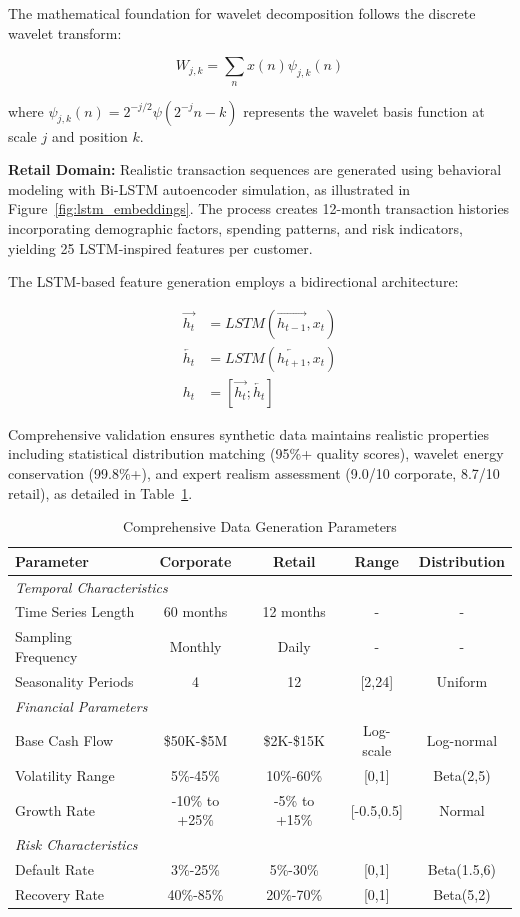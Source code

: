 \documentclass[a4 paper, 11pt,twoside]{article}
\newcommand{\0}{\Bf{0}}
\theoremstyle{definition}
\begin{document}
The mathematical foundation for wavelet decomposition follows the discrete wavelet transform:

\begin{equation}
W_{j,k} = \sum_{n} x(n) \psi_{j,k}(n)
\end{equation}

where $\psi_{j,k}(n) = 2^{-j/2} \psi(2^{-j}n - k)$ represents the wavelet basis function at scale $j$ and position $k$.

\textbf{Retail Domain:} Realistic transaction sequences are generated using behavioral modeling with Bi-LSTM autoencoder simulation, as illustrated in Figure~\ref{fig:lstm_embeddings}. The process creates 12-month transaction histories incorporating demographic factors, spending patterns, and risk indicators, yielding 25 LSTM-inspired features per customer.

The LSTM-based feature generation employs a bidirectional architecture:

\begin{align}
\overrightarrow{h_t} &= LSTM(\overrightarrow{h_{t-1}}, x_t) \\
\overleftarrow{h_t} &= LSTM(\overleftarrow{h_{t+1}}, x_t) \\
h_t &= [\overrightarrow{h_t}; \overleftarrow{h_t}]
\end{align}

Comprehensive validation ensures synthetic data maintains realistic properties including statistical distribution matching (95\%+ quality scores), wavelet energy conservation (99.8\%+), and expert realism assessment (9.0/10 corporate, 8.7/10 retail), as detailed in Table~\ref{tab:data_generation_params}.

\begin{table}
\centering
\caption{Comprehensive Data Generation Parameters}
\label{tab:data_generation_params}
\begin{tabular}{lcccc}
\toprule
\textbf{Parameter} & \textbf{Corporate} & \textbf{Retail} & \textbf{Range} & \textbf{Distribution} \\
\midrule
\multicolumn{5}{l}{\textit{Temporal Characteristics}} \\
Time Series Length & 60 months & 12 months & - & - \\
Sampling Frequency & Monthly & Daily & - & - \\
Seasonality Periods & 4 & 12 & [2,24] & Uniform \\
\midrule
\multicolumn{5}{l}{\textit{Financial Parameters}} \\
Base Cash Flow & \$50K-\$5M & \$2K-\$15K & Log-scale & Log-normal \\
Volatility Range & 5\%-45\% & 10\%-60\% & [0,1] & Beta(2,5) \\
Growth Rate & -10\% to +25\% & -5\% to +15\% & [-0.5,0.5] & Normal \\
\midrule
\multicolumn{5}{l}{\textit{Risk Characteristics}} \\
Default Rate & 3\%-25\% & 5\%-30\% & [0,1] & Beta(1.5,6) \\
Recovery Rate & 40\%-85\% & 20\%-70\% & [0,1] & Beta(5,2) \\
\bottomrule
\end{tabular}
\end{table}
\end{document}
